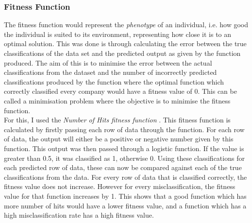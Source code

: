 \documentclass[11pt]{article}
\begin{document}
\subsubsection{Fitness Function}
The fitness function would represent the \textit{phenotype} of an individual, i.e. how good the individual is suited to its environment, representing how close it is to an optimal solution. This was done is through calculating the error between the true classifications of the data set and the predicted output as given by the function produced. The aim of this is to minimise the error between the actual classifications from the dataset and the number of incorrectly predicted classifications produced by the function where the optimal function which correctly classified every company would have a fitness value of 0. This can be called a minimisation problem where the objective is to minimise the fitness function. \\
For this, I used the \textit{Number of Hits fitness function} \cite{?} . This fitness function is calculated by firstly passing each row of data through the function. For each row of data, the output will either be a positive or negative number given by this function. This output was then passed through a logistic function. If the value is greater than 0.5, it was classified as 1, otherwise 0. Using these classifications for each predicted row of data, these can now be compared against each of the true classifications from the data. For every row of data that is classified correctly, the fitness value does not increase. However for every misclassification, the fitness value for that function increases by 1. This shows that a good function which has more number of hits would have a lower fitness value, and a function which has a high misclassification rate has a high fitness value. 
\end{document}
